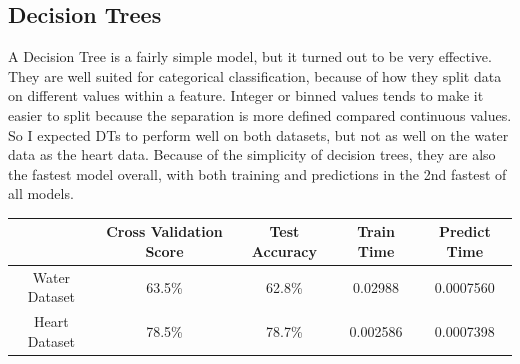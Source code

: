 \documentclass[
	letterpaper, %
]{mlreport}
\begin{document}
\subsection{Decision Trees}
A Decision Tree is a fairly simple model, but it turned out to be very effective. They are well suited for categorical classification, because of how they split data on different values within a feature. Integer or binned values tends to make it easier to split because the separation is more defined compared continuous values. So I expected DTs to perform well on both datasets, but not as well on the water data as the heart data. Because of the simplicity of decision trees, they are also the fastest model overall, with both training and predictions in the 2nd fastest of all models.
\begin{center}
	\begin{tabular}{|c||c|c|c|c|}
	 \hline
	  & Cross Validation Score & Test Accuracy & Train Time & Predict Time \\
	 \hline\hline
	 Water Dataset & 63.5\%  & 62.8\% & 0.02988 & 0.0007560 \\
	 \hline
	 Heart Dataset & 78.5\%  & 78.7\% & 0.002586 & 0.0007398 \\
	 \hline
	\end{tabular}
	\label{table:table1}
\end{center}
\end{document}
